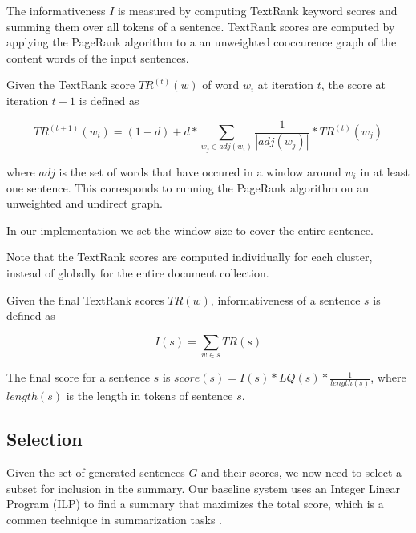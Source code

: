 \documentclass[a4paper,BCOR=10mm]{report}
\numberwithin{lemma}{chapter}
\numberwithin{definition}{chapter}
\begin{document}
The informativeness $I$ is measured by computing TextRank \citep{textrank} keyword scores and summing them over all tokens of a sentence.
TextRank scores are computed by applying the PageRank \citep{pagerank} algorithm to a an unweighted cooccurence graph of the content words of the input sentences.

Given the TextRank score $TR^{(t)}(w)$ of word $w_i$ at iteration $t$, the score at iteration $t + 1$ is defined as

\begin{equation}
TR^{(t + 1)}(w_i) = (1 - d) + d * \sum_{w_j \in \mathit{adj}(w_i)} \frac{1}{|\mathit{adj}(w_j)|} * TR^{(t)}(w_j)
\end{equation}

where $\mathit{adj}$ is the set of words that have occured in a window around $w_i$ in at least one sentence.
This corresponds to running the PageRank algorithm on an unweighted and undirect graph.

In our implementation we set the window size to cover the entire sentence.

Note that the TextRank scores are computed individually for each cluster, instead of globally for the entire document collection.

Given the final TextRank scores $TR(w)$, informativeness of a sentence $s$ is defined as

\begin{equation}
    I(s) = \sum_{w \in s} TR(s)
\end{equation}

The final score for a sentence $s$ is $\mathit{score}(s) = I(s) * LQ(s) * \frac{1}{\mathit{length}(s)}$, where $\mathit{length}(s)$ is the length in tokens of sentence $s$. %


\subsection{Selection} \label{sec:baseline-selection}

Given the set of generated sentences $G$ and their scores, we now need to select a subset for inclusion in the summary.
Our baseline system uses an Integer Linear Program (ILP) to find a summary that maximizes the total score, which is a commen technique in summarization tasks \citep{survey}. %
\end{document}
